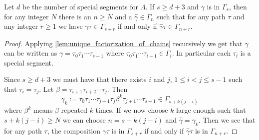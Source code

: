 \begin{lemma}\cite[Theorem~2.2]{GKK91}\label{lem:monomial_relation_repetition}
	Let $d$ be the number of special segments for $\Lambda$. If $s \geq d+3$ and $\gamma$ is in $\Gamma_s$, then for any integer $N$ there is an $n \geq N$ and a $\hat{\gamma} \in \Gamma_n$ such that for any path $\tau$ and any integer $r \geq 1$ we have $\gamma\tau \in \Gamma_{s+r}$ if and only if $\hat{\gamma}\tau \in \Gamma_{n+r}$.
	\begin{proof}
		Applying \cref{lem:unique_factorization_of_chains} recursively we get that $\gamma$ can be written as $\gamma = \tau_0\tau_1\cdots \tau_{s-1}$ where $\tau_0\tau_1 \cdots \tau_{i-1} \in \Gamma_i$. In particular each $\tau_i$ is a special segment.
		
		Since $s \geq d+3$ we must have that there exists $i$ and $j$, $1\leq i < j \leq s-1$ such that $\tau_i=\tau_j$. Let $\beta = \tau_{i+1}\tau_{i+2}\cdots\tau_j$. Then $$\gamma_k := \tau_0\tau_1\cdots\tau_{j-1}\tau_j\beta^k\tau_{j+1}\cdots\tau_{s-1} \in \Gamma_{s + k(j-i)}$$
		where $\beta^k$ means $\beta$ repeated $k$ times. If we now choose $k$ large enough such that $s+k(j-i) \geq N$ we can choose $n=s+k(j-i)$ and $\hat{\gamma}=\gamma_k$. Then we see that for any path $\tau$, the composition $\gamma\tau$ is in $\Gamma_{s+r}$ if and only if $\hat{\gamma}\tau$ is in $\Gamma_{n+r}$.
	\end{proof}
\end{lemma}

